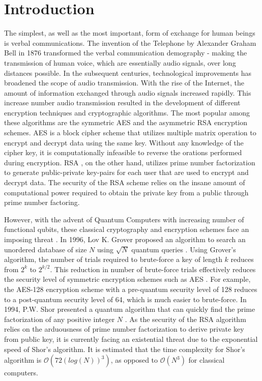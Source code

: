 \documentclass[12pt]{article}
\begin{document}
\section{Introduction}
The simplest, as well as the most important, form of exchange for human beings is verbal communications. The invention of the Telephone by Alexander Graham Bell in 1876 transformed the verbal communication demography - making the transmission of human voice, which are essentially audio signals, over long distances possible. In the subsequent centuries, technological improvements has broadened the scope of audio transmission. With the rise of the Internet, the amount of information exchanged through audio signals increased rapidly. This increase number audio transmission resulted in the development of different encryption techniques and cryptographic algorithms. The most popular among these algorithms are the symmetric AES and the asymmetric RSA encryption schemes. AES \cite{rijmen2001advanced} is a block cipher scheme that utilizes multiple matrix operation to encrypt and decrypt data using the same key. Without any knowledge of the cipher key, it is computationally infeasible to reverse the orations performed during encryption. RSA \cite{rivest1978method}, on the other hand, utilizes prime number factorization to generate public-private key-pairs for each user that are used to encrypt and decrypt data. The security of the RSA scheme relies on the insane amount of computational power required to obtain the private key from a public through prime number factoring.

However, with the advent of Quantum Computers with increasing number of functional qubits, these classical cryptography and encryption schemes face an imposing threat \cite{bernstein2017post}. In 1996, Lov K. Grover proposed an algorithm to search an unordered database of size $N$ using $\sqrt{N}$ quantum queries \cite{grover1996fast}. Using Grover's algorithm, the number of trials required to brute-force a key of length $k$ reduces from $2^{k}$ to $2^{k/2}$. This reduction in number of brute-force trials effectively reduces the security level of symmetric encryption schemes such as AES \cite{Daemen2002}. For example, the AES-128 encryption scheme with a pre-quantum security level of 128 reduces to a post-quantum security level of 64, which is much easier to brute-force. In 1994, P.W. Shor presented a quantum algorithm that can quickly find the prime factorization of any positive integer $N$ \cite{Shor1997}. As the security of the RSA algorithm relies on the arduousness of prime number factorization to derive private key from public key, it is currently facing an existential threat due to the exponential speed of Shor's algorithm. It is estimated that the time complexity for Shor's algorithm is $\mathcal{O}(72(log(N))^{3})$, as opposed to $\mathcal{O}(N^3)$ for classical computers.
\end{document}
